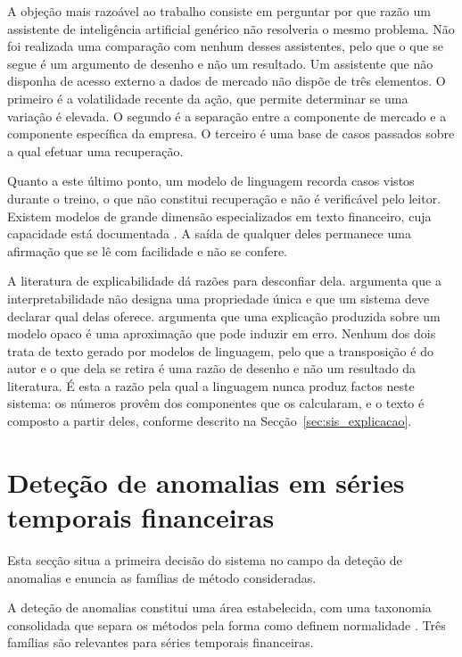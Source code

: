 A objeção mais razoável ao trabalho consiste em perguntar por que razão um assistente de
inteligência artificial genérico não resolveria o mesmo problema. Não foi realizada uma comparação
com nenhum desses assistentes, pelo que o que se segue é um argumento de desenho e não um resultado.
Um assistente que não disponha de acesso externo a dados de mercado não dispõe de três elementos.
O primeiro é a volatilidade recente da ação, que permite determinar se uma variação é elevada. O
segundo é a separação entre a componente de mercado e a componente específica da empresa. O
terceiro é uma base de casos passados sobre a qual efetuar uma recuperação.

Quanto a este último ponto, um modelo de linguagem recorda
casos vistos durante o treino, o que não constitui recuperação e não é verificável pelo leitor.
Existem modelos de grande dimensão especializados em texto financeiro, cuja capacidade está
documentada \autocite{li2023llmfinance}. A saída de qualquer deles permanece uma afirmação que se lê com facilidade e não se confere.

A
literatura de explicabilidade dá razões para desconfiar dela. \textcite{lipton2018mythos}
argumenta que a interpretabilidade não designa uma propriedade única e que um sistema deve
declarar qual delas oferece. \textcite{rudin2019stop} argumenta que uma explicação produzida sobre
um modelo opaco é uma aproximação que pode induzir em erro. Nenhum dos dois trata de texto gerado por modelos de linguagem, pelo que a transposição é do
autor e o que dela se retira é uma razão de desenho e não um resultado da literatura. É esta a razão pela qual a linguagem nunca produz
factos neste sistema: os números provêm dos componentes que os calcularam, e o texto é composto a
partir deles, conforme descrito na Secção~\ref{sec:sis_explicacao}.

\section{Deteção de anomalias em séries temporais financeiras}
\label{sec:ctx_anomalias}

Esta secção situa a primeira decisão do sistema no campo da deteção de anomalias e enuncia as
famílias de método consideradas.

A deteção de anomalias constitui uma área estabelecida, com uma taxonomia consolidada que separa os
métodos pela forma como definem normalidade \autocite{chandola2009anomaly, pang2021deep}. Três
famílias são relevantes para séries temporais financeiras.

